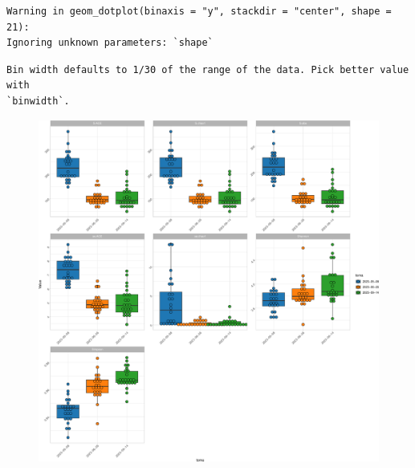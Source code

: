 \documentclass[
  letterpaper,
  DIV=11,
  numbers=noendperiod]{scrartcl}
\begin{document}
\begin{verbatim}
Warning in geom_dotplot(binaxis = "y", stackdir = "center", shape = 21):
Ignoring unknown parameters: `shape`
\end{verbatim}

\begin{verbatim}
Bin width defaults to 1/30 of the range of the data. Pick better value with
`binwidth`.
\end{verbatim}

\begin{figure}[H]

{\centering \includegraphics{InformeNeiker_files/figure-pdf/unnamed-chunk-7-4.pdf}

}

\end{figure}
\end{document}
